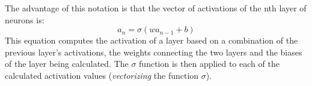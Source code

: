 \documentclass[a4paper,12pt]{article}
\begin{document}
The advantage of this notation is that the vector of activations of the nth layer of neurons is: $$a_n = \sigma (wa_{n-1}+b)$$ This equation computes the activation of a layer based on a combination of the previous layer's activations, the weights connecting the two layers and the biases of the layer being calculated. The $\sigma$ function is then applied to each of the calculated activation values (\textit{vectorizing} the function $\sigma$).
\end{document}
